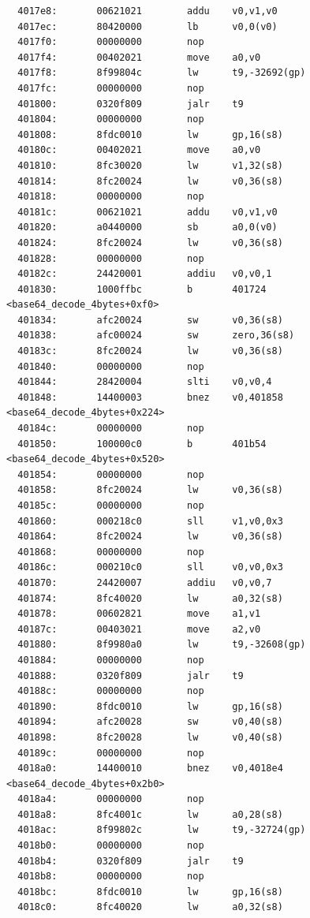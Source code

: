\documentclass[11pt]{article}
\begin{document}
\begin{verbatim}
  4017e8:       00621021        addu    v0,v1,v0
  4017ec:       80420000        lb      v0,0(v0)
  4017f0:       00000000        nop
  4017f4:       00402021        move    a0,v0
  4017f8:       8f99804c        lw      t9,-32692(gp)
  4017fc:       00000000        nop
  401800:       0320f809        jalr    t9
  401804:       00000000        nop
  401808:       8fdc0010        lw      gp,16(s8)
  40180c:       00402021        move    a0,v0
  401810:       8fc30020        lw      v1,32(s8)
  401814:       8fc20024        lw      v0,36(s8)
  401818:       00000000        nop
  40181c:       00621021        addu    v0,v1,v0
  401820:       a0440000        sb      a0,0(v0)
  401824:       8fc20024        lw      v0,36(s8)
  401828:       00000000        nop
  40182c:       24420001        addiu   v0,v0,1
  401830:       1000ffbc        b       401724 <base64_decode_4bytes+0xf0>
  401834:       afc20024        sw      v0,36(s8)
  401838:       afc00024        sw      zero,36(s8)
  40183c:       8fc20024        lw      v0,36(s8)
  401840:       00000000        nop
  401844:       28420004        slti    v0,v0,4
  401848:       14400003        bnez    v0,401858 <base64_decode_4bytes+0x224>
  40184c:       00000000        nop
  401850:       100000c0        b       401b54 <base64_decode_4bytes+0x520>
  401854:       00000000        nop
  401858:       8fc20024        lw      v0,36(s8)
  40185c:       00000000        nop
  401860:       000218c0        sll     v1,v0,0x3
  401864:       8fc20024        lw      v0,36(s8)
  401868:       00000000        nop
  40186c:       000210c0        sll     v0,v0,0x3
  401870:       24420007        addiu   v0,v0,7
  401874:       8fc40020        lw      a0,32(s8)
  401878:       00602821        move    a1,v1
  40187c:       00403021        move    a2,v0
  401880:       8f9980a0        lw      t9,-32608(gp)
  401884:       00000000        nop
  401888:       0320f809        jalr    t9
  40188c:       00000000        nop
  401890:       8fdc0010        lw      gp,16(s8)
  401894:       afc20028        sw      v0,40(s8)
  401898:       8fc20028        lw      v0,40(s8)
  40189c:       00000000        nop
  4018a0:       14400010        bnez    v0,4018e4 <base64_decode_4bytes+0x2b0>
  4018a4:       00000000        nop
  4018a8:       8fc4001c        lw      a0,28(s8)
  4018ac:       8f99802c        lw      t9,-32724(gp)
  4018b0:       00000000        nop
  4018b4:       0320f809        jalr    t9
  4018b8:       00000000        nop
  4018bc:       8fdc0010        lw      gp,16(s8)
  4018c0:       8fc40020        lw      a0,32(s8)

\end{verbatim}
\end{document}
